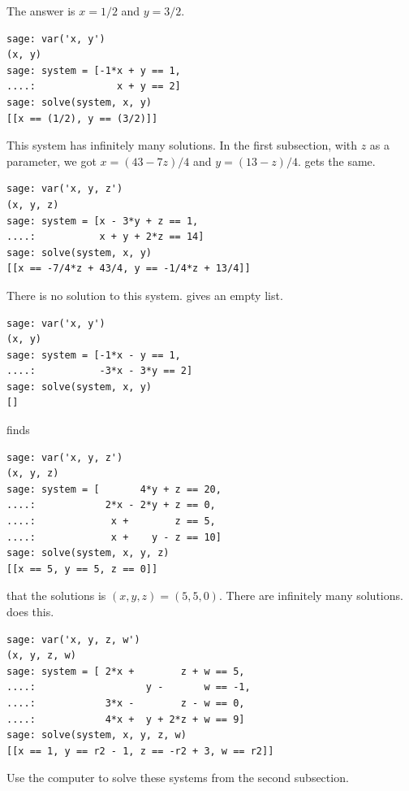 \begin{exercises}
\begin{answer}
\begin{exparts}
        \partsitem The answer is \( x=1/2 \) and \( y=3/2 \). 
\begin{lstlisting}
sage: var('x, y')
(x, y)
sage: system = [-1*x + y == 1,
....:              x + y == 2]
sage: solve(system, x, y)
[[x == (1/2), y == (3/2)]]          
\end{lstlisting}
        \partsitem This system has infinitely many solutions.
           In the first subsection, with $z$ as a parameter, 
           we got $x=(43-7z)/4$ and $y=(13-z)/4$.
           \Sage{} gets the same.
\begin{lstlisting}
sage: var('x, y, z')
(x, y, z)
sage: system = [x - 3*y + z == 1,
....:           x + y + 2*z == 14]
sage: solve(system, x, y)
[[x == -7/4*z + 43/4, y == -1/4*z + 13/4]]             
\end{lstlisting}
        \partsitem There is no solution to this system.
           \Sage{} gives an empty list.
\begin{lstlisting}
sage: var('x, y')
(x, y)
sage: system = [-1*x - y == 1,
....:           -3*x - 3*y == 2]
sage: solve(system, x, y)
[]          
\end{lstlisting}
        \partsitem \Sage{} finds 
\begin{lstlisting}
sage: var('x, y, z')
(x, y, z)
sage: system = [       4*y + z == 20,
....:            2*x - 2*y + z == 0,
....:             x +        z == 5,
....:             x +    y - z == 10]
sage: solve(system, x, y, z)
[[x == 5, y == 5, z == 0]]          
\end{lstlisting}
           that the solutions is \( (x,y,z)=(5,5,0) \).
        \partsitem There are infinitely many solutions.
           \Sage{} does this.
\begin{lstlisting}
sage: var('x, y, z, w')
(x, y, z, w)
sage: system = [ 2*x +        z + w == 5,
....:                   y -       w == -1,
....:            3*x -        z - w == 0,
....:            4*x +  y + 2*z + w == 9]
sage: solve(system, x, y, z, w)
[[x == 1, y == r2 - 1, z == -r2 + 3, w == r2]]          
\end{lstlisting}
      \end{exparts}
    \end{answer}
  \item 
    Use the computer to solve these systems from the second subsection.
\end{exercises}
